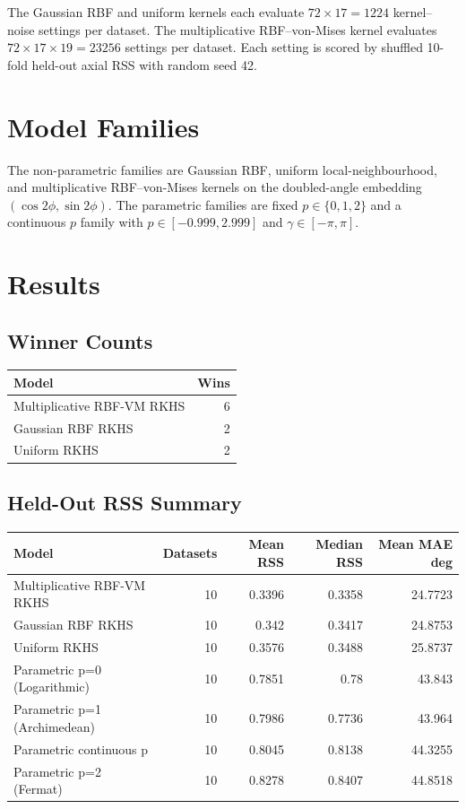 \documentclass[10pt]{article}
\begin{document}
The Gaussian RBF and uniform kernels each evaluate $72\times17=1224$ kernel--noise settings per dataset.  The multiplicative RBF--von-Mises kernel evaluates $72\times17\times19=23256$ settings per dataset.  Each setting is scored by shuffled 10-fold held-out axial RSS with random seed 42.

\section{Model Families}
The non-parametric families are Gaussian RBF, uniform local-neighbourhood, and multiplicative RBF--von-Mises kernels on the doubled-angle embedding $(\cos 2\phi,\sin 2\phi)$.  The parametric families are fixed $p\in\{0,1,2\}$ and a continuous $p$ family with $p\in[-0.999,2.999]$ and $\gamma\in[-\pi,\pi]$.

\section{Results}
\subsection{Winner Counts}
\begin{center}
\begin{tabular}{lr}
\toprule
Model & Wins \\
\midrule
Multiplicative RBF-VM RKHS & 6 \\
Gaussian RBF RKHS & 2 \\
Uniform RKHS & 2 \\
\bottomrule
\end{tabular}
\end{center}

\subsection{Held-Out RSS Summary}
\begin{center}
\begin{tabular}{lrrrr}
\toprule
Model & Datasets & Mean RSS & Median RSS & Mean MAE deg \\
\midrule
Multiplicative RBF-VM RKHS & 10 & 0.3396 & 0.3358 & 24.7723 \\
Gaussian RBF RKHS & 10 & 0.342 & 0.3417 & 24.8753 \\
Uniform RKHS & 10 & 0.3576 & 0.3488 & 25.8737 \\
Parametric p=0 (Logarithmic) & 10 & 0.7851 & 0.78 & 43.843 \\
Parametric p=1 (Archimedean) & 10 & 0.7986 & 0.7736 & 43.964 \\
Parametric continuous p & 10 & 0.8045 & 0.8138 & 44.3255 \\
Parametric p=2 (Fermat) & 10 & 0.8278 & 0.8407 & 44.8518 \\
\bottomrule
\end{tabular}
\end{center}
\end{document}
